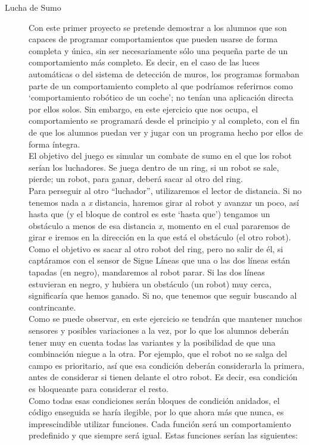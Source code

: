 \begin{description}
	\item[Lucha de Sumo]\label{ej:sumo}
	Con este primer proyecto se pretende demostrar a los alumnos que son capaces de programar comportamientos que pueden usarse de forma completa y única, sin ser necesariamente sólo una pequeña parte de un comportamiento más completo. Es decir, en el caso de las luces automáticas o del sistema de detección de muros, los programas formaban parte de un comportamiento completo al que podríamos referirnos como \break `comportamiento robótico de un coche'; no tenían una aplicación directa por ellos solos. Sin embargo, en este ejercicio que nos ocupa, el comportamiento se programará desde el principio y al completo, con el fin de que los alumnos puedan ver y jugar con un programa hecho por ellos de forma íntegra. \\
	El objetivo del juego es simular un combate de sumo en el que los robot serían los luchadores. Se juega dentro de un ring, si un robot se sale, pierde; un robot, para ganar, deberá sacar al otro del ring. \\
	Para perseguir al otro ``luchador'', utilizaremos el lector de distancia. Si no tenemos nada a \textit{x} distancia, haremos girar al robot y avanzar un poco, así hasta que (y el bloque de control es este `hasta que') tengamos un obstáculo a menos de esa distancia \textit{x}, momento en el cual pararemos de girar e iremos en la dirección en la que está el obstáculo (el otro robot). Como el objetivo es sacar al otro robot del ring, pero no salir de él, si captáramos con el sensor de Sigue Líneas que una o las dos líneas están tapadas (en negro), mandaremos al robot parar. Si las dos líneas estuvieran en negro, y hubiera un obstáculo (un robot) muy cerca, significaría que hemos ganado. Si no, que tenemos que seguir buscando al contrincante.\\	
	Como se puede observar, en este ejercicio se tendrán que mantener muchos sensores y posibles variaciones a la vez, por lo que los alumnos deberán tener muy en cuenta todas las variantes y la posibilidad de que una combinación niegue a la otra. Por ejemplo, que el robot no se salga del campo es prioritario, así que esa condición deberán considerarla la primera, antes de considerar si tienen delante el otro robot. Es decir, esa condición es bloqueante para considerar el resto.\\
	Como todas esas condiciones serán bloques de condición anidados, el código enseguida se haría ilegible, por lo que ahora más que nunca, es imprescindible utilizar funciones. Cada función será un comportamiento predefinido y que siempre será igual. Estas funciones serían las siguientes:

\end{description}
